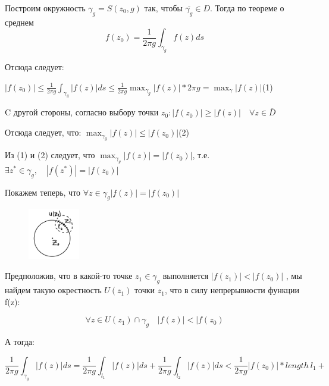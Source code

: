 \documentclass[a4paper, 12pt]{report}
\begin{document}
\par\bigskip Построим окружность $\gamma_g=S(z_0, g)$ так, чтобы $\overline{\gamma_g}\in D$. Тогда по теореме о среднем $$f(z_0)=\frac1{2\pi g}\int_{\gamma_g}f(z)ds$$

Отсюда следует:
 \par\bigskip
$|f(z_0)|\leqslant \frac1{2\pi g}\int_{\gamma_g}|f(z)|ds \leqslant \frac1{2\pi g}\max_{\gamma_g} |f(z)| *2\pi g=\max_{\gamma} |f(z)|$\quad\quad(1)\\
 \par\bigskip
 C другой стороны, согласно выбору точки $z_0: |f(z_0)|\geqslant |f(z)|\quad \forall z\in \overline{D}$
 \par\bigskip
 Отсюда следует, что: $\max_{\gamma_g} |f(z)|\le |f(z_0)|$\quad\quad (2)
 \par\bigskip
 Из (1) и (2) следует, что $\max_{\gamma_g} |f(z)|= |f(z_0)|$, 
 т.е. $\exists z^* \in \gamma_g , \quad |f(z^*)|=|f(z_0)|$
 \par\bigskip
 Покажем теперь, что $\forall z \in \gamma_g |f(z)|=|f(z_0)|$
 
 \begin{figure} 
    \vspace{-15pt}
    \includegraphics[width=0.2\textwidth]{max mod FKP/2maxModFKP.png}
\end{figure}
 \par\bigskip
 Предположив, что в какой-то точке $z_1 \in \gamma_g$ выполняется $|f(z_1)|<|f(z_0)|$ , мы найдем такую окрестность $U(z_1)$ точки $z_1$, что в силу непрерывности функции f(z):
 
 $$\forall z \in U(z_1) \cap \gamma_g \quad|f(z)|<|f(z_0)$$
 
 А тогда:\par$$\frac1{2\pi g}\int_{\gamma_g}|f(z)|ds=\frac1{2\pi g}\int_{l_1}|f(z)|ds+\frac1{2\pi g}\int_{l_2}|f(z)|ds< \frac1{2\pi g}|f(z_0)|*length\  l_1+$$
 
\end{document}

